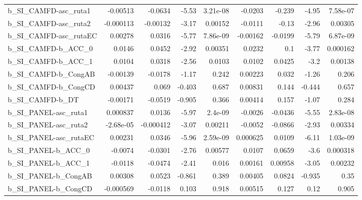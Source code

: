 \begin{tabular}{lrrrrrrrr}
b\_SI\_CAMFD-asc\_ruta1  &    -0.00513 &      -0.0634 &   -5.53 & 3.21e-08 &    -0.0203 &      -0.239 &        -4.95 &      7.58e-07 \\
b\_SI\_CAMFD-asc\_ruta2  &   -0.000113 &     -0.00132 &   -3.17 &  0.00152 &    -0.0111 &       -0.13 &        -2.96 &       0.00305 \\
b\_SI\_CAMFD-asc\_rutaEC &     0.00278 &       0.0316 &   -5.77 & 7.86e-09 &   -0.00162 &     -0.0199 &        -5.79 &      6.87e-09 \\
b\_SI\_CAMFD-b\_ACC\_0    &      0.0146 &       0.0452 &   -2.92 &  0.00351 &     0.0232 &         0.1 &        -3.77 &      0.000162 \\
b\_SI\_CAMFD-b\_ACC\_1    &      0.0104 &       0.0318 &   -2.56 &   0.0103 &     0.0102 &      0.0425 &         -3.2 &       0.00138 \\
b\_SI\_CAMFD-b\_CongAB   &    -0.00139 &      -0.0178 &   -1.17 &    0.242 &    0.00223 &       0.032 &        -1.26 &         0.206 \\
b\_SI\_CAMFD-b\_CongCD   &     0.00437 &        0.069 &  -0.403 &    0.687 &    0.00831 &       0.144 &       -0.444 &         0.657 \\
b\_SI\_CAMFD-b\_DT       &    -0.00171 &      -0.0519 &  -0.905 &    0.366 &    0.00414 &       0.157 &        -1.07 &         0.284 \\
b\_SI\_PANEL-asc\_ruta1  &    0.000837 &       0.0136 &   -5.97 &  2.4e-09 &    -0.0026 &     -0.0436 &        -5.55 &      2.83e-08 \\
b\_SI\_PANEL-asc\_ruta2  &   -2.68e-05 &    -0.000412 &   -3.07 &  0.00211 &    -0.0052 &     -0.0866 &        -2.93 &       0.00334 \\
b\_SI\_PANEL-asc\_rutaEC &     0.00231 &       0.0346 &   -5.96 & 2.59e-09 &   0.000625 &      0.0109 &        -6.11 &      1.03e-09 \\
b\_SI\_PANEL-b\_ACC\_0    &     -0.0074 &      -0.0301 &   -2.76 &  0.00577 &     0.0107 &      0.0659 &         -3.6 &      0.000318 \\
b\_SI\_PANEL-b\_ACC\_1    &     -0.0118 &      -0.0474 &   -2.41 &    0.016 &    0.00161 &     0.00958 &        -3.05 &       0.00232 \\
b\_SI\_PANEL-b\_CongAB   &     0.00308 &       0.0523 &  -0.861 &    0.389 &    0.00405 &      0.0824 &       -0.935 &          0.35 \\
b\_SI\_PANEL-b\_CongCD   &   -0.000569 &      -0.0118 &   0.103 &    0.918 &    0.00515 &       0.127 &         0.12 &         0.905 \\

\end{tabular}
